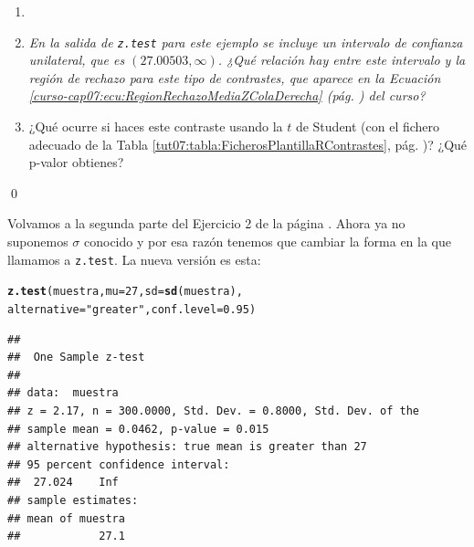 \documentclass[10pt,a4paper]{article}\usepackage[]{graphicx}\usepackage[]{color}
\makeatletter
\newcommand{\hlnum}[1]{\textcolor[rgb]{0.686,0.059,0.569}{#1}}%
\newcommand{\hlstr}[1]{\textcolor[rgb]{0.192,0.494,0.8}{#1}}%
\newcommand{\hlstd}[1]{\textcolor[rgb]{0.345,0.345,0.345}{#1}}%
\newcommand{\hlkwc}[1]{\textcolor[rgb]{0.333,0.667,0.333}{#1}}%
\newcommand{\hlkwd}[1]{\textcolor[rgb]{0.737,0.353,0.396}{\textbf{#1}}}%
\newenvironment{kframe}{%
 \def\at@end@of@kframe{}%
 \ifinner\ifhmode%
  \def\at@end@of@kframe{\end{minipage}}%
  \begin{minipage}{\columnwidth}%
 \fi\fi%
 \def\FrameCommand##1{\hskip\@totalleftmargin \hskip-\fboxsep
 \colorbox{shadecolor}{##1}\hskip-\fboxsep
     \hskip-\linewidth \hskip-\@totalleftmargin \hskip\columnwidth}%
 \MakeFramed {\advance\hsize-\width
   \@totalleftmargin\z@ \linewidth\hsize
   \@setminipage}}%
 {\par\unskip\endMakeFramed%
 \at@end@of@kframe}
\newenvironment{knitrout}{}{} %
\newcounter {cont01}
\makeatother
\begin{document}
\begin{ejercicio}
\label{tut07:ejercicio13}
\begin{enumerate}
  \item[]
  \item {\em En la salida de {\tt z.test} para este ejemplo se incluye un {\em intervalo de confianza unilateral}, que es $(27.00503, \ensuremath{\infty{}})$. ¿Qué relación hay entre este intervalo y la región de rechazo para este tipo de contrastes, que aparece en la Ecuación \ref{curso-cap07:ecu:RegionRechazoMediaZColaDerecha} (pág. \pageref{curso-cap07:ecu:RegionRechazoMediaZColaDerecha}) del curso? }

  \item ¿Qué ocurre si haces este contraste usando la $t$ de Student (con el fichero adecuado de la Tabla  \ref{tut07:tabla:FicherosPlantillaRContrastes}, pág. \pageref{tut07:tabla:FicherosPlantillaRContrastes})? ¿Qué p-valor obtienes?

\end{enumerate}

\qed
\end{ejercicio}


Volvamos a la segunda parte del Ejercicio 2 de la página \pageref{tut07:subsubsec:EjerciciosContrasteHipotesis}. Ahora ya no suponemos $\sigma$ conocido y por esa razón tenemos que cambiar la forma en la que llamamos a {\tt z.test}.  La nueva versión es esta:

\begin{knitrout}
\color{fgcolor}\begin{kframe}
\begin{alltt}
\hlkwd{z.test}\hlstd{(muestra,} \hlkwc{mu} \hlstd{=} \hlnum{27}\hlstd{,} \hlkwc{sd} \hlstd{=} \hlkwd{sd}\hlstd{(muestra),}
  \hlkwc{alternative} \hlstd{=} \hlstr{"greater"}\hlstd{,} \hlkwc{conf.level} \hlstd{=} \hlnum{0.95}\hlstd{)}
\end{alltt}
\begin{verbatim}
## 
## 	One Sample z-test
## 
## data:  muestra
## z = 2.17, n = 300.0000, Std. Dev. = 0.8000, Std. Dev. of the
## sample mean = 0.0462, p-value = 0.015
## alternative hypothesis: true mean is greater than 27
## 95 percent confidence interval:
##  27.024    Inf
## sample estimates:
## mean of muestra 
##            27.1
\end{verbatim}
\end{kframe}
\end{knitrout}
\end{document}
